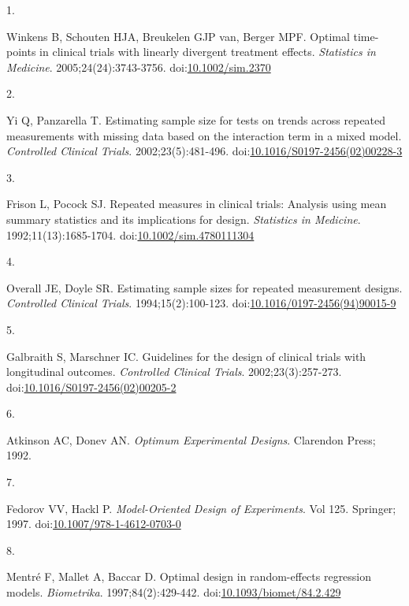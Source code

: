 \documentclass[
  11pt,
]{article}
\newlength{\cslhangindent}
\newlength{\csllabelwidth}
\newenvironment{CSLReferences}[2] %
 {\begin{list}{}{%
  \setlength{\itemindent}{0pt}
  \setlength{\leftmargin}{0pt}
  \setlength{\parsep}{0pt}
  \ifodd #1
   \setlength{\leftmargin}{\cslhangindent}
   \setlength{\itemindent}{-1\cslhangindent}
  \fi
  \setlength{\itemsep}{#2\baselineskip}}}
 {\end{list}}
\newcommand{\CSLLeftMargin}[1]{\parbox[t]{\csllabelwidth}{\strut#1\strut}}
\newcommand{\CSLRightInline}[1]{\parbox[t]{\linewidth - \csllabelwidth}{\strut#1\strut}}
\begin{document}
\protect{}\label{refs}
\begin{CSLReferences}{0}{1}
\CSLLeftMargin{1. }%
\CSLRightInline{Winkens B, Schouten HJA, Breukelen GJP van, Berger MPF. Optimal time-points in clinical trials with linearly divergent treatment effects. \emph{Statistics in Medicine}. 2005;24(24):3743-3756. doi:\href{https://doi.org/10.1002/sim.2370}{10.1002/sim.2370}}

\CSLLeftMargin{2. }%
\CSLRightInline{Yi Q, Panzarella T. Estimating sample size for tests on trends across repeated measurements with missing data based on the interaction term in a mixed model. \emph{Controlled Clinical Trials}. 2002;23(5):481-496. doi:\href{https://doi.org/10.1016/S0197-2456(02)00228-3}{10.1016/S0197-2456(02)00228-3}}

\CSLLeftMargin{3. }%
\CSLRightInline{Frison L, Pocock SJ. Repeated measures in clinical trials: Analysis using mean summary statistics and its implications for design. \emph{Statistics in Medicine}. 1992;11(13):1685-1704. doi:\href{https://doi.org/10.1002/sim.4780111304}{10.1002/sim.4780111304}}

\CSLLeftMargin{4. }%
\CSLRightInline{Overall JE, Doyle SR. Estimating sample sizes for repeated measurement designs. \emph{Controlled Clinical Trials}. 1994;15(2):100-123. doi:\href{https://doi.org/10.1016/0197-2456(94)90015-9}{10.1016/0197-2456(94)90015-9}}

\CSLLeftMargin{5. }%
\CSLRightInline{Galbraith S, Marschner IC. Guidelines for the design of clinical trials with longitudinal outcomes. \emph{Controlled Clinical Trials}. 2002;23(3):257-273. doi:\href{https://doi.org/10.1016/S0197-2456(02)00205-2}{10.1016/S0197-2456(02)00205-2}}

\CSLLeftMargin{6. }%
\CSLRightInline{Atkinson AC, Donev AN. \emph{Optimum Experimental Designs}. Clarendon Press; 1992.}

\CSLLeftMargin{7. }%
\CSLRightInline{Fedorov VV, Hackl P. \emph{Model-Oriented Design of Experiments}. Vol 125. Springer; 1997. doi:\href{https://doi.org/10.1007/978-1-4612-0703-0}{10.1007/978-1-4612-0703-0}}

\CSLLeftMargin{8. }%
\CSLRightInline{Mentré F, Mallet A, Baccar D. Optimal design in random-effects regression models. \emph{Biometrika}. 1997;84(2):429-442. doi:\href{https://doi.org/10.1093/biomet/84.2.429}{10.1093/biomet/84.2.429}}


\end{CSLReferences}
\end{document}
